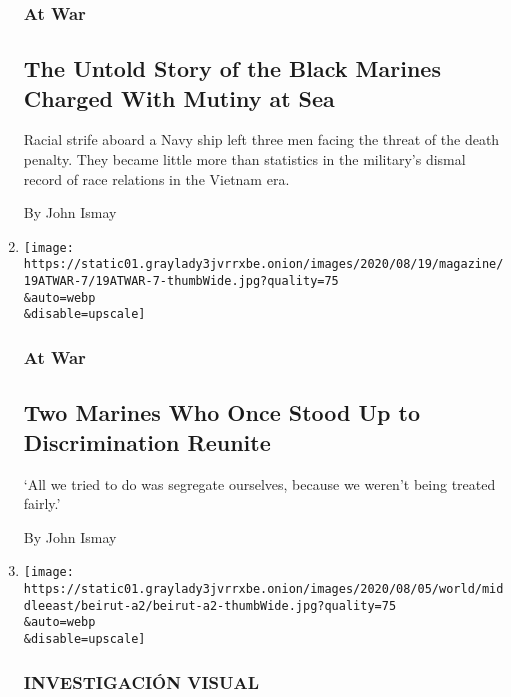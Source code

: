 \begin{enumerate}
  \hypertarget{at-war-1}{%
  \subsubsection{At War}\label{at-war-1}}

  \hypertarget{the-untold-story-of-the-black-marines-charged-with-mutiny-at-sea}{%
  \subsection{The Untold Story of the Black Marines Charged With Mutiny
  at
  Sea}\label{the-untold-story-of-the-black-marines-charged-with-mutiny-at-sea}}

  Racial strife aboard a Navy ship left three men facing the threat of
  the death penalty. They became little more than statistics in the
  military's dismal record of race relations in the Vietnam era.

  By John Ismay
\item
  \href{/2020/08/19/magazine/black-marines-reunion.html}{}

  \texttt{[image: https://static01.graylady3jvrrxbe.onion/images/2020/08/19/magazine/19ATWAR-7/19ATWAR-7-thumbWide.jpg?quality=75\\\&auto=webp\\\&disable=upscale]}

  \hypertarget{at-war-2}{%
  \subsubsection{At War}\label{at-war-2}}

  \hypertarget{two-marines-who-once-stood-up-to-discrimination-reunite}{%
  \subsection{Two Marines Who Once Stood Up to Discrimination
  Reunite}\label{two-marines-who-once-stood-up-to-discrimination-reunite}}

  `All we tried to do was segregate ourselves, because we weren't being
  treated fairly.'

  By John Ismay
\item
  \href{/es/2020/08/06/espanol/mundo/beirut-video-explosion-libano.html}{}

  \texttt{[image: https://static01.graylady3jvrrxbe.onion/images/2020/08/05/world/middleeast/beirut-a2/beirut-a2-thumbWide.jpg?quality=75\\\&auto=webp\\\&disable=upscale]}

  \hypertarget{investigaciuxf3n-visual}{%
  \subsubsection{INVESTIGACIÓN VISUAL}\label{investigaciuxf3n-visual}}


\end{enumerate}
